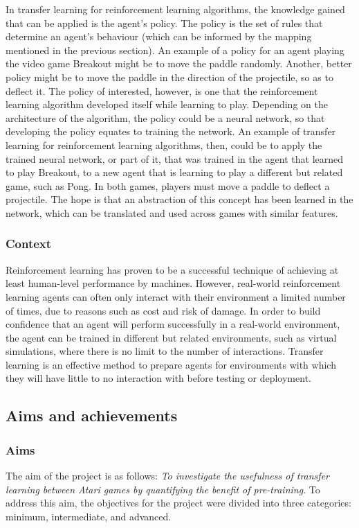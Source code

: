 \documentclass[12pt,a4paper]{article}
\begin{document}
In transfer learning for reinforcement learning algorithms, the knowledge gained that can be applied is the agent's policy. The policy is the set of rules that determine an agent's behaviour (which can be informed by the mapping mentioned in the previous section). An example of a policy for an agent playing the video game Breakout might be to move the paddle randomly. Another, better policy might be to move the paddle in the direction of the projectile, so as to deflect it. The policy of interested, however, is one that the reinforcement learning algorithm developed itself while learning to play. Depending on the architecture of the algorithm, the policy could be a neural network, so that developing the policy equates to training the network. An example of transfer learning for reinforcement learning algorithms, then, could be to apply the trained neural network, or part of it, that was trained in the agent that learned to play Breakout, to a new agent that is learning to play a different but related game, such as Pong. In both games, players must move a paddle to deflect a projectile. The hope is that an abstraction of this concept has been learned in the network, which can be translated and used across games with similar features.

\subsubsection{Context}
Reinforcement learning has proven to be a successful technique of achieving at least human-level performance by machines. However, real-world reinforcement learning agents can often only interact with their environment a limited number of times, due to reasons such as cost and risk of damage. In order to build confidence that an agent will perform successfully in a real-world environment, the agent can be trained in different but related environments, such as virtual simulations, where there is no limit to the number of interactions. Transfer learning is an effective method to prepare agents for environments with which they will have little to no interaction with before testing or deployment. 

\subsection{Aims and achievements}
\subsubsection{Aims}
The aim of the project is as follows: \textit{To investigate the usefulness of transfer learning between Atari games by quantifying the benefit of pre-training}. To address this aim, the objectives for the project were divided into three categories: minimum, intermediate, and advanced. 
\end{document}
